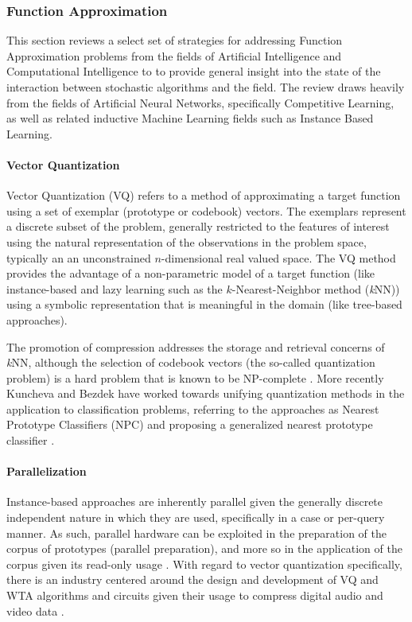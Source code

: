 %
%
\subsubsection{Function Approximation}
This section reviews a select set of strategies for addressing Function Approximation problems from the fields of Artificial Intelligence and Computational Intelligence to to provide general insight into the state of the interaction between stochastic algorithms and the field. The review draws heavily from the fields of Artificial Neural Networks, specifically Competitive Learning, as well as related inductive Machine Learning fields such as Instance Based Learning.

\paragraph{Vector Quantization}
Vector Quantization (VQ) refers to a method of approximating a target function using a set of exemplar (prototype or codebook) vectors. The exemplars represent a discrete subset of the problem, generally restricted to the features of interest using the natural representation of the observations in the problem space, typically an an unconstrained $n$-dimensional real valued space. The VQ method provides the advantage of a non-parametric model of a target function (like instance-based and lazy learning such as the $k$-Nearest-Neighbor method (\emph{k}NN)) using a symbolic representation that is meaningful in the domain (like tree-based approaches). 

The promotion of compression addresses the storage and retrieval concerns of \emph{k}NN, although the selection of codebook vectors (the so-called quantization problem) is a hard problem that is known to be NP-complete \cite{Garey1982}. More recently Kuncheva and Bezdek have worked towards unifying quantization methods in the application to classification problems, referring to the approaches as Nearest Prototype Classifiers (NPC) and proposing a generalized nearest prototype classifier \cite{Kuncheva1998, Kuncheva1998a}.
	
\paragraph{Parallelization} 
Instance-based approaches are inherently parallel given the generally discrete independent nature in which they are used, specifically in a case or per-query manner. As such, parallel hardware can be exploited in the preparation of the corpus of prototypes (parallel preparation), and more so in the application of the corpus given its read-only usage \cite{Aamodt1994, Nagendra1996, Plaza1997}. With regard to vector quantization specifically, there is an industry centered around the design and development of VQ and WTA algorithms and circuits given their usage to compress digital audio and video data \cite{Nakada1999, Parhi1994}.
	
